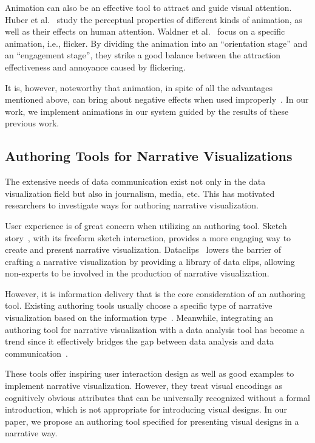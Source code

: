 Animation can also be an effective tool to attract and guide visual attention. Huber et al.~\cite{huber_visualizing_2005} study the perceptual properties of different kinds of animation, as well as their effects on human attention. Waldner et al.~\cite{waldner_attractive_2014} focus on a specific animation, i.e., flicker. By dividing the animation into an “orientation stage” and an “engagement stage”, they strike a good balance between the attraction effectiveness and annoyance caused by flickering. 

It is, however, noteworthy that animation, in spite of all the advantages mentioned above, can bring about negative effects when used improperly~\cite{robertson_effectiveness_2008}. In our work, we implement animations in our system guided by the results of these previous work.

\subsection{Authoring Tools for Narrative Visualizations}
The extensive needs of data communication exist not only in the data visualization field but also in journalism, media, etc. This has motivated researchers to investigate ways for authoring narrative visualization. 

User experience is of great concern when utilizing an authoring tool. Sketch story~\cite{lee_sketchstory:_2013}, with its freeform sketch interaction, provides a more engaging way to create and present narrative visualization. Dataclips~\cite{amini_authoring_2017} lowers the barrier of crafting a narrative visualization by providing a library of data clips, allowing non-experts to be involved in the production of narrative visualization. 

However, it is information delivery that is the core consideration of an authoring tool. Existing authoring tools usually choose a specific type of narrative visualization based on the information type~\cite{amini_authoring_2017, fulda_timelinecurator:_2016}. Meanwhile, integrating an authoring tool for narrative visualization with a  data analysis tool has become a trend since it effectively bridges the gap between data analysis and data communication~\cite{eccles_stories_2007, bryan_temporal_2016,lee_more_2015}. 
 
These tools offer inspiring user interaction design as well as good examples to implement narrative visualization. However, they treat visual encodings as cognitively obvious attributes that can be universally recognized without a formal introduction, which is not appropriate for introducing visual designs. In our paper, we propose an authoring tool specified for presenting visual designs in a narrative way. 

